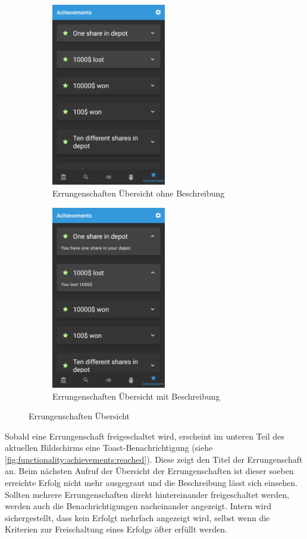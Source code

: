 \documentclass[a4paper]{article}
\begin{document}
\begin{figure}[H]
    \begin{subfigure}{.5\textwidth}
        \centering
        \includegraphics[height=8cm,keepaspectratio]{./images/achievements_list.png}  
        \caption{Errungenschaften Übersicht ohne Beschreibung}
        \label{fig:functionality:achievements:overview:closed}
    \end{subfigure}
    \begin{subfigure}{.5\textwidth}
        \centering
        \includegraphics[height=8cm,keepaspectratio]{./images/achievements_list_open.png}  
        \caption{Errungenschaften Übersicht mit Beschreibung}
        \label{fig:functionality:achievements:overview:open}
    \end{subfigure}
    \caption{Errungenschaften Übersicht}
    \label{fig:functionality:achievements:overview}
\end{figure}

Sobald eine Errungenschaft freigeschaltet wird, erscheint im unteren Teil des aktuellen Bildschirms eine Toast-Benachrichtigung \autocite{android_toasts} (siehe \autoref{fig:functionality:achievements:reached}). Diese zeigt den Titel der Errungenschaft an. Beim nächsten Aufruf der Übersicht der Errungenschaften ist dieser soeben erreichte Erfolg nicht mehr ausgegraut und die Beschreibung lässt sich einsehen. Sollten mehrere Errungenschaften direkt hintereinander freigeschaltet werden, werden auch die Benachrichtigungen nacheinander angezeigt. Intern wird sichergestellt, dass kein Erfolgt mehrfach angezeigt wird, selbst wenn die Kriterien zur Freischaltung eines Erfolgs öfter erfüllt werden.
\end{document}
